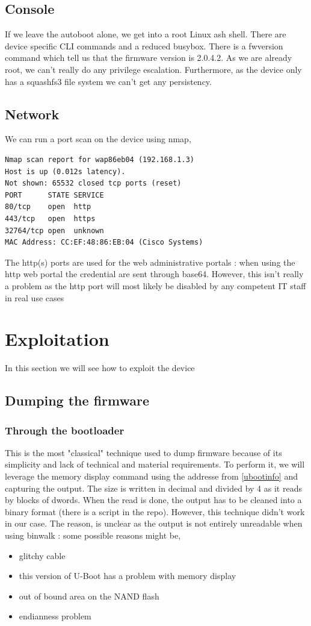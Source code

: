 \documentclass{article}
\begin{document}
\subsection{Console}
If we leave the autoboot alone, we get into a root Linux ash shell. There are device specific CLI commands and a reduced busybox. There is a fwversion command which tell us that the firmware version is 2.0.4.2. As we are already root, we can't really do any privilege escalation. Furthermore, as the device only has a squashfs3 file system we can't get any persistency.
\subsection{Network}
We can run a port scan on the device using nmap, 

\begin{lstlisting}
Nmap scan report for wap86eb04 (192.168.1.3)  
Host is up (0.012s latency).  
Not shown: 65532 closed tcp ports (reset)  
PORT      STATE SERVICE  
80/tcp    open  http  
443/tcp   open  https  
32764/tcp open  unknown  
MAC Address: CC:EF:48:86:EB:04 (Cisco Systems)
\end{lstlisting}

The http(s) ports are used for the web administrative portals : when using the http web portal the credential are sent through base64. However, this isn't really a problem as the http port will most likely be disabled by any competent IT staff in real use cases
\section{Exploitation}
In this section we will see how to exploit the device
\subsection{Dumping the firmware}
\subsubsection{Through the bootloader}\label{Dumpuboot}
This is the most "classical" technique used to dump firmware because of its simplicity and lack of technical and material requirements. To perform it, we will leverage the memory display command using the addresse from \ref{ubootinfo} and capturing the output. The size is written in decimal and divided by 4 as it reads by blocks of dwords. When the read is done, the output has to be cleaned into a binary format (there is a script in the repo). However, this technique didn't work in our case. The reason, is unclear as the output is not entirely unreadable when using binwalk : some possible reasons might be,
\begin{itemize}
	\item glitchy cable
	\item this version of U-Boot has a problem with memory display
	\item out of bound area on the NAND flash
	\item endianness problem	
\end{itemize}
\end{document}
